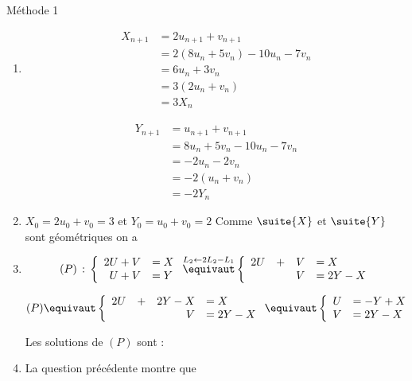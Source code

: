 \documentclass[a4paper, 11pt,reqno]{article}
\begin{document}
\begin{correction}
Méthode 1
\begin{enumerate}
\item \begin{align*}
X_{n+1}&= 2u_{n+1} +v_{n+1}\\
			&= 2(8u_n+5v_n) -10u_n-7v_n\\
			&= 6u_n+3v_n\\
			&= 3(2u_n+v_n)\\
			&= 3X_n
\end{align*}


\begin{align*}
Y_{n+1}&= u_{n+1} +v_{n+1}\\
			&= 8u_n+5v_n -10u_n-7v_n\\
			&= -2u_n-2v_n\\
			&= -2(u_n+v_n)\\
			&= -2Y_n
\end{align*}


\item $X_0=2u_0+v_0=3$ et $Y_0=u_0+v_0=2$
Comme $\suite{X}$ et $\suite{Y}$ sont géométriques on  a 

\item 
$$(P)\,:\, \left\{\begin{array}{rl}
2U +V&=X\\
U+V&=Y
\end{array}\right.\overset{L_2\leftarrow2L_2-L_1}{\equivaut } \left\{\begin{array}{rcrl}
2U &+&V&=X\\
&&V&=2Y-X
\end{array}\right.$$

$$(P) \equivaut \left\{\begin{array}{rcrl}
2U &+&2Y-X&=X\\
&&V&=2Y-X
\end{array}\right.\equivaut \left\{ \begin{array}{rl}
U&=-Y+X\\
V&=2Y-X
\end{array}\right.$$

Les solutions de $(P)$ sont : 
\item 
La question précédente montre que 


\end{enumerate}
\end{correction}
\end{document}
